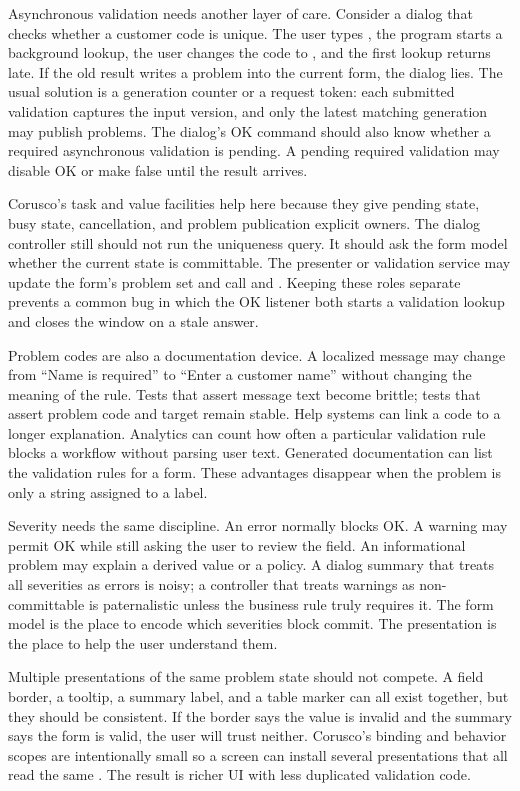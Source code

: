 Asynchronous validation needs another layer of care. Consider a dialog that
checks whether a customer code is unique. The user types , the
program starts a background lookup, the user changes the code to ,
and the first lookup returns late. If the old result writes a problem into the
current form, the dialog lies. The usual solution is a generation counter or a
request token: each submitted validation captures the input version, and only
the latest matching generation may publish problems. The dialog's OK command
should also know whether a required asynchronous validation is pending. A
pending required validation may disable OK or make  false
until the result arrives.

Corusco's task and value facilities help here because they give pending state,
busy state, cancellation, and problem publication explicit owners. The dialog
controller still should not run the uniqueness query. It should ask the form
model whether the current state is committable. The presenter or validation
service may update the form's problem set and call 
and . Keeping these roles separate
prevents a common bug in which the OK listener both starts a validation lookup
and closes the window on a stale answer.

Problem codes are also a documentation device. A localized message may change
from ``Name is required'' to ``Enter a customer name'' without changing the
meaning of the rule. Tests that assert message text become brittle; tests that
assert problem code and target remain stable. Help systems can link a code to a
longer explanation. Analytics can count how often a particular validation rule
blocks a workflow without parsing user text. Generated documentation can list
the validation rules for a form. These advantages disappear when the problem is
only a string assigned to a label.

Severity needs the same discipline. An error normally blocks OK. A warning may
permit OK while still asking the user to review the field. An informational
problem may explain a derived value or a policy. A dialog summary that treats
all severities as errors is noisy; a controller that treats warnings as
non-committable is paternalistic unless the business rule truly requires it.
The form model is the place to encode which severities block commit. The
presentation is the place to help the user understand them.

Multiple presentations of the same problem state should not compete. A field
border, a tooltip, a summary label, and a table marker can all exist together,
but they should be consistent. If the border says the value is invalid and the
summary says the form is valid, the user will trust neither. Corusco's binding
and behavior scopes are intentionally small so a screen can install several
presentations that all read the same . The result is richer UI
with less duplicated validation code.

